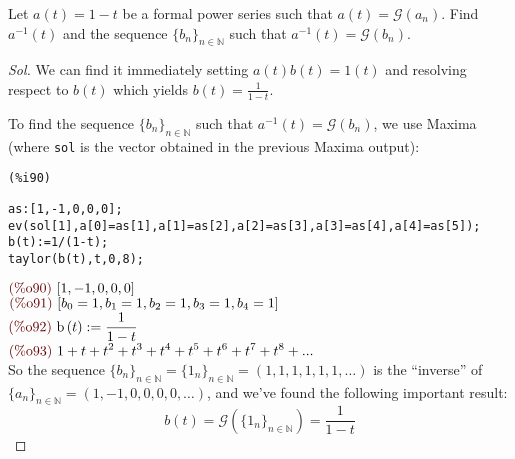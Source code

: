 \begin{exercise}
  Let $a(t) = 1-t$ be a formal power series such that $a(t) =
  \mathcal{G} (a_n)$. Find $a^{-1}(t)$ and the sequence
  $\{b_n\}_{n\in\mathbb{N} } $ such that $a^{-1}(t) = \mathcal{G}(b_n)
  $.
\end{exercise}
\begin{proof}[Sol]
  We can find it immediately setting $a(t)b(t)=1(t)$ and resolving
  respect to $b(t)$ which yields $b(t) = \frac{1}{1-t} $.

  To find the sequence $\{b_n\}_{n\in\mathbb{N} } $ such that
  $a^{-1}(t) = \mathcal{G}(b_n) $, we use Maxima (where
  \texttt{\color{blue}sol} is the vector obtained in the previous
  Maxima output):\\
\noindent
\begin{minipage}[t]{8ex}{\color{red}\bf
\begin{verbatim}
(%i90) 
\end{verbatim}}
\end{minipage}
\begin{minipage}[t]{\textwidth}{\color{blue}
\begin{verbatim}
as:[1,-1,0,0,0];
ev(sol[1],a[0]=as[1],a[1]=as[2],a[2]=as[3],a[3]=as[4],a[4]=as[5]);
b(t):=1/(1-t);
taylor(b(t),t,0,8);
\end{verbatim}}
\end{minipage}
\begin{math}\displaystyle
\parbox{8ex}{\color{labelcolor}(\%o90) }
[1,-1,0,0,0]
\end{math}\\
\begin{math}\displaystyle
\parbox{8ex}{\color{labelcolor}(\%o91) }
[{b}_{0}=1,{b}_{1}=1,{b}_{2}=1,{b}_{3}=1,{b}_{4}=1]
\end{math}\\
\begin{math}\displaystyle
\parbox{8ex}{\color{labelcolor}(\%o92) }
\mathrm{b}\left( t\right) :=\frac{1}{1-t}
\end{math}\\
\begin{math}\displaystyle
\parbox{8ex}{\color{labelcolor}(\%o93) }
1+t+{t}^{2}+{t}^{3}+{t}^{4}+{t}^{5}+{t}^{6}+{t}^{7}+{t}^{8}+...
\end{math}\\
So the sequence $\{b_n\}_{n\in\mathbb{N} } =\{1_n\}_{n\in\mathbb{N} }
=(1,1,1,1,1,1,\ldots)$ is the ``inverse'' of $\{a_n\}_{n\in\mathbb{N}
} =(1,-1,0,0,0,0,\ldots)$, and we've found the following important
result:
\begin{equation}
  \label{eq:genfun-of-ones-sequence}
  b(t) = \mathcal{G} (\{1_n\}_{n\in\mathbb{N} }) =  \frac{1}{1-t}
\end{equation}
\end{proof}

